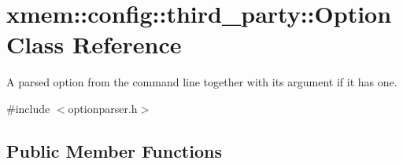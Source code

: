 \hypertarget{classxmem_1_1config_1_1third__party_1_1_option}{\section{xmem\-:\-:config\-:\-:third\-\_\-party\-:\-:Option Class Reference}
\label{classxmem_1_1config_1_1third__party_1_1_option}
}


A parsed option from the command line together with its argument if it has one.  




{\ttfamily \#include $<$optionparser.\-h$>$}

\subsection*{Public Member Functions}
